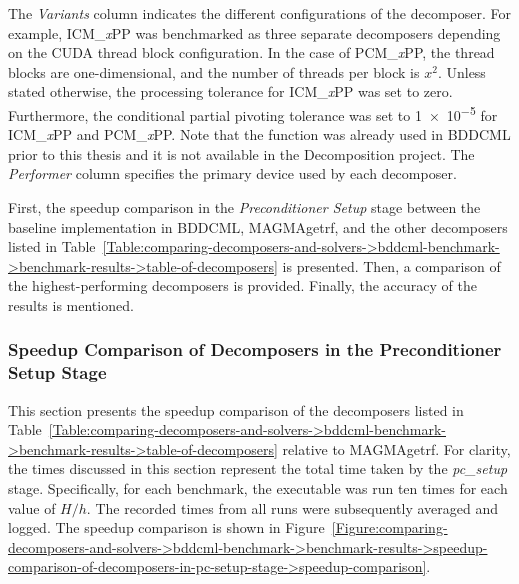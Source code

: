 \begin{table}[ht!]
{		The \textit{Variants} column indicates the different configurations of the decomposer.
		For example, ICM\_\textit{x}PP was benchmarked as three separate decomposers depending on the CUDA thread block configuration.
		In the case of PCM\_\textit{x}PP, the thread blocks are one-dimensional, and the number of threads per block is $x^2$.
		Unless stated otherwise, the processing tolerance for ICM\_\textit{x}PP was set to zero.
		Furthermore, the conditional partial pivoting tolerance was set to \num{1e-5} for ICM\_\textit{x}PP and PCM\_\textit{x}PP.
		Note that the  function was already used in BDDCML prior to this thesis and it is not available in the Decomposition project.
		The \textit{Performer} column specifies the primary device used by each decomposer.
	}
	\label{Table:comparing-decomposers-and-solvers->bddcml-benchmark->benchmark-results->table-of-decomposers}
\end{table}

First, the speedup comparison in the \textit{Preconditioner Setup} stage between the baseline implementation in BDDCML, MAGMAgetrf, and the other decomposers listed in Table~\ref{Table:comparing-decomposers-and-solvers->bddcml-benchmark->benchmark-results->table-of-decomposers} is presented.
Then, a comparison of the highest-performing decomposers is provided.
Finally, the accuracy of the results is mentioned.


\subsubsection{Speedup Comparison of Decomposers in the Preconditioner Setup Stage}\label{Subsection:comparing-decomposers-and-solvers->bddcml-benchmark->benchmark-results->speedup-comparison-of-decomposers-in-pc-setup-stage}
This section presents the speedup comparison of the decomposers listed in Table~\ref{Table:comparing-decomposers-and-solvers->bddcml-benchmark->benchmark-results->table-of-decomposers} relative to MAGMAgetrf.
For clarity, the times discussed in this section represent the total time taken by the \textit{pc\_setup} stage.
Specifically, for each benchmark, the  executable was run ten times for each value of $H/h$.
The recorded times from all runs were subsequently averaged and logged.
The speedup comparison is shown in Figure~\ref{Figure:comparing-decomposers-and-solvers->bddcml-benchmark->benchmark-results->speedup-comparison-of-decomposers-in-pc-setup-stage->speedup-comparison}.

